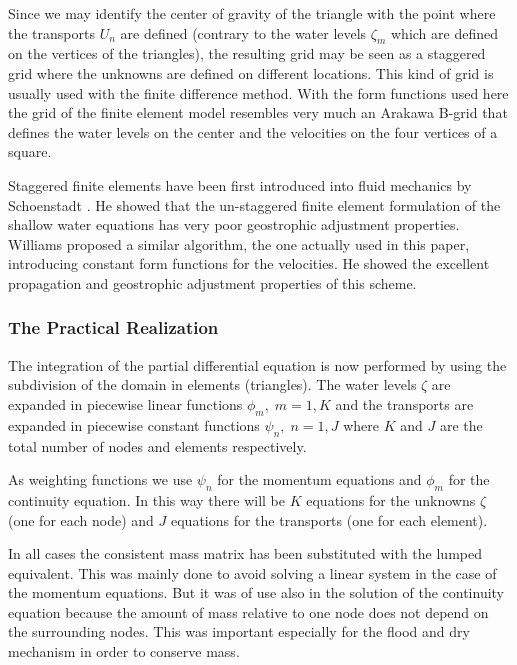 Since we may
identify the center of gravity of the triangle with the point where
the transports $U_{n}$ are defined (contrary to the water levels
$\zeta_{m}$ which are defined on the vertices of the triangles), the
resulting grid may be seen as a staggered grid where the unknowns
are defined on different locations. This kind of grid is usually used
with the finite difference method. With the form functions used here
the grid of the finite element model resembles
very much an Arakawa B-grid that defines the water levels on the center
and the velocities on the four vertices of a square.

Staggered finite elements have been first introduced into
fluid mechanics by Schoenstadt \cite{Schoenstadt80}. 
He showed that the un-staggered
finite element formulation of the shallow water equations has very
poor geostrophic adjustment properties. Williams 
\cite{Williams81a, Williams81b}
proposed a similar algorithm, the one
actually used in this paper, introducing constant form functions for the
velocities. He showed the excellent propagation and geostrophic
adjustment properties of this scheme.


\subsubsection{The Practical Realization}

The integration of the partial differential equation is now performed by
using the subdivision of the domain in elements (triangles). The
water levels $\zeta$ are expanded in piecewise linear functions
$\phi_{m}, \; m=1,K$ and
the transports are expanded in piecewise constant functions
$\psi_{n}, \; n=1,J$ where $K$ and $J$ are the total number of nodes
and elements respectively.

As weighting functions we use $\psi_{n}$ for the momentum equations
and $\phi_{m}$ for the continuity equation. In this way there will
be $K$ equations for the unknowns $\zeta$ (one for each node) and
$J$ equations for the transports (one for each element).

In all cases the consistent mass matrix has been substituted with
the lumped equivalent. This was mainly done
to avoid solving a linear system in the case of the momentum equations.
But it was of use also in the solution of the continuity equation
because the amount of mass relative to 
one node does not depend on the surrounding
nodes. This was important especially for the flood and dry mechanism
in order to conserve mass.


